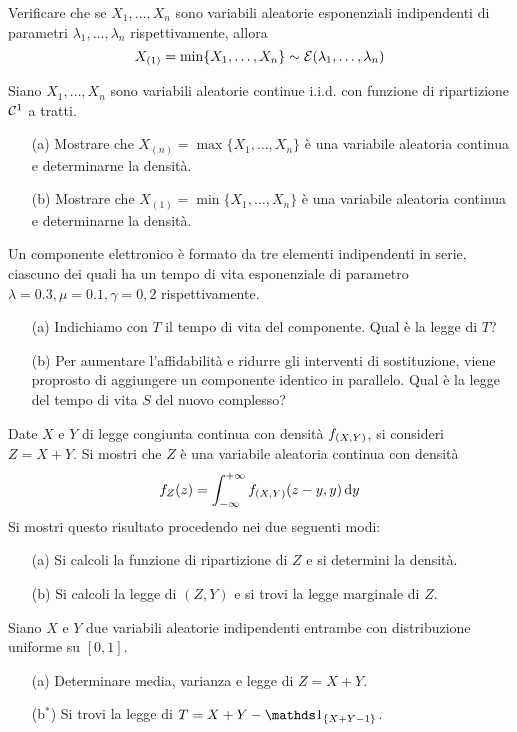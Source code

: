 \Esercizio{} %
Verificare che se $X_1,\dots,X_n$ sono variabili aleatorie esponenziali indipendenti di parametri $\lambda_1,\dots,\lambda_n$ rispettivamente, allora
\[
X_{(1)}=\min\{X_1,\dots,X_n  \}\sim\mathcal{E}(\lambda_1,\dots,\lambda_n)
\]

\Esercizio{} %
Siano $X_1,\dots,X_n$ sono variabili aleatorie continue i.i.d. con funzione di ripartizione $\mathcal{C}^1$ a tratti. 
\begin{enumerate}
\item [(a)] Mostrare che $X_{(n)}=\max\{ X_1,\dots,X_n \}$ è una variabile aleatoria continua e determinarne la densità.
\item [(b)] Mostrare che $X_{(1)}=\min\{ X_1,\dots,X_n \}$ è una variabile aleatoria continua e determinarne la densità.
\end{enumerate}

\Esercizio{}
Un componente elettronico è formato da tre elementi indipendenti in serie, ciascuno dei quali ha un tempo di vita esponenziale di parametro $\lambda=0.3,\mu=0.1,\gamma=0,2$ rispettivamente.
\begin{enumerate}
\item [(a)] Indichiamo con $T$ il tempo di vita del componente. Qual è la legge di $T$?
\item [(b)] Per aumentare l'affidabilità e ridurre gli interventi di sostituzione, viene proprosto di aggiungere un componente identico in parallelo. Qual è la legge del tempo di vita $S$ del nuovo complesso?
\end{enumerate}

\Esercizio{}
Date $X$ e $Y$ di legge congiunta continua con densità $f_{(X,Y)}$, si consideri $Z=X+Y$. Si mostri che $Z$ è una variabile aleatoria continua con densità
\[
f_Z(z)=\int_{-\infty}^{+\infty} f_{(X,Y)}(z-y,y)\, \mathrm{d} y
\]
Si mostri questo risultato procedendo nei due seguenti modi:
\begin{enumerate}
\item [(a)] Si calcoli la funzione di ripartizione di $Z$ e si determini la densità.
\item [(b)] Si calcoli la legge di $(Z,Y)$ e si trovi la legge marginale di $Z$.
\end{enumerate}

\Esercizio{}
Siano $X$ e $Y$ due variabili aleatorie indipendenti entrambe con distribuzione uniforme su $[0,1]$.
\begin{enumerate}
\item [(a)] Determinare media, varianza e legge di $Z=X+Y$.
\item [(b$^*$)] Si trovi la legge di $T=X+Y-\Ind_{\{ X+Y-1 \}}$.
\end{enumerate}

